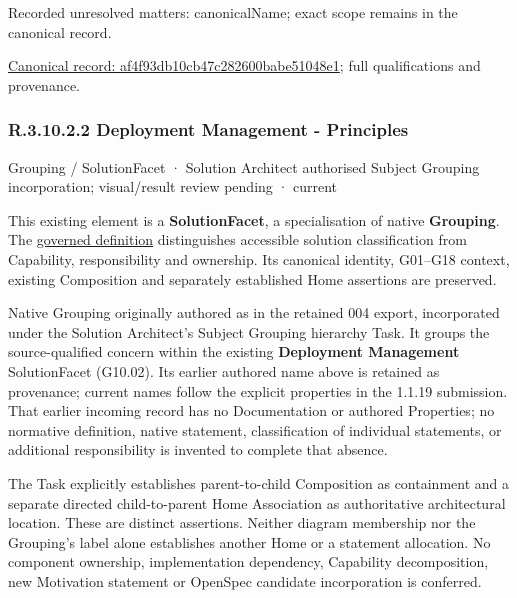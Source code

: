 {\small Recorded unresolved matters: canonicalName; exact scope remains in the canonical record.}\par
{\footnotesize \href{../../../../../../../continuum/grouping/af4f93db10cb47c282600babe51048e1.md}{Canonical record: af4f93db10cb47c282600babe51048e1}; full qualifications and provenance.}\par
\subsubsection*{R.3.10.2.2 Deployment Management - Principles}
\label{navigation:R.3.10.2.2}

\label{element:50a4cb6b01c94904a0991175ab09004c}
{\small Grouping / SolutionFacet · Solution Architect authorised Subject Grouping incorporation; visual/result review pending · current}\par

This existing element is a \textbf{SolutionFacet}, a specialisation of native
\textbf{Grouping}. The \href{\detokenize{../../../../../../../governance/continuum-representation.md#solutionfacet-classification--1119-candidate}}{governed definition}
distinguishes accessible solution classification from Capability, responsibility
and ownership. Its canonical identity, G01–G18 context, existing Composition
and separately established Home assertions are preserved.



Native Grouping originally authored as \texttt{} in the retained 004 export,
incorporated under the Solution Architect's Subject Grouping hierarchy Task.
It groups the source-qualified \texttt{} concern within
the existing \textbf{Deployment Management} SolutionFacet (G10.02). Its earlier authored name above is retained as provenance; current names
follow the explicit properties in the 1.1.19 submission.
That earlier incoming record has no Documentation or authored Properties; no normative
definition, native statement, classification of individual statements, or
additional responsibility is invented to complete that absence.



The Task explicitly establishes parent-to-child Composition as containment and
a separate directed child-to-parent Home Association as authoritative architectural
location. These are distinct assertions. Neither diagram membership nor the
Grouping's label alone establishes another Home or a statement allocation.
No component ownership, implementation dependency, Capability decomposition,
new Motivation statement or OpenSpec candidate incorporation is conferred.



